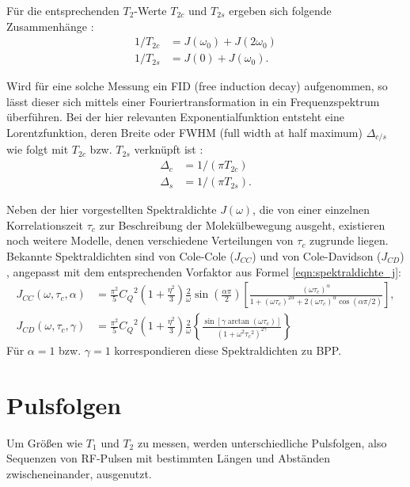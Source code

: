 Für die entsprechenden $T_2$-Werte $T_{2c}$ und $T_{2s}$ ergeben sich folgende Zusammenhänge \cite{eckert}:
\begin{align}
    1/T_{2c} &= J(\omega_0) + J(2\omega_0) \\
    1/T_{2s} &= J(0) + J(\omega_0).
\end{align}

Wird für eine solche Messung ein FID (free induction decay) aufgenommen, so lässt dieser sich mittels einer Fouriertransformation in ein Frequenzspektrum überführen. Bei der hier relevanten Exponentialfunktion entsteht eine Lorentzfunktion, deren Breite oder FWHM (full width at half maximum) $\Delta_{c/s}$ wie folgt mit $T_{2c}$ bzw. $T_{2s}$ verknüpft ist \cite{werbelow}:
\begin{align}
    \Delta_c &= 1/(\pi T_{2c}) \\ \label{eqn:fwhm}
    \Delta_s &= 1/(\pi T_{2s}).
\end{align}

Neben der hier vorgestellten Spektraldichte $J(\omega)$, die von einer einzelnen Korrelationszeit $\tau_c$ zur Beschreibung der Molekülbewegung ausgeht, existieren noch weitere Modelle, denen verschiedene Verteilungen von $\tau_c$ zugrunde liegen. Bekannte Spektraldichten sind von Cole-Cole ($J_{CC}$) und von Cole-Davidson ($J_{CD}$) \cite[S. 105-108]{beckmann_relaxation}, angepasst mit dem entsprechenden Vorfaktor aus Formel \eqref{eqn:spektraldichte_j}:
\begin{align}
    J_{CC}(\omega, \tau_c, \alpha) &= \frac{\pi^2}{5} {C_Q}^2 \left( 1 + \frac{\eta^2}{3} \right) \frac{2}{\omega} \sin \left( \frac{\alpha \pi}{2} \right) \left[ \frac{(\omega \tau_c)^\alpha}{1 + (\omega \tau_c)^{2\alpha} + 2 (\omega \tau_c)^\alpha \cos (\alpha \pi / 2)} \right], \\
    J_{CD}(\omega, \tau_c, \gamma) &= \frac{\pi^2}{5} {C_Q}^2 \left( 1 + \frac{\eta^2}{3} \right) \frac{2}{\omega} \left\{ \frac{\sin [\gamma \arctan(\omega \tau_c)]}{(1 + \omega^2 {\tau_c}^2)^{2\gamma}} \right\}
\end{align}
Für $\alpha = 1$ bzw. $\gamma = 1$ korrespondieren diese Spektraldichten zu BPP.





\section{Pulsfolgen} \label{section:exp:pulsfolgen}

Um Größen wie $T_1$ und $T_2$ zu messen, werden unterschiedliche Pulsfolgen, also Sequenzen von RF-Pulsen mit bestimmten Längen und Abständen zwischeneinander, ausgenutzt.

